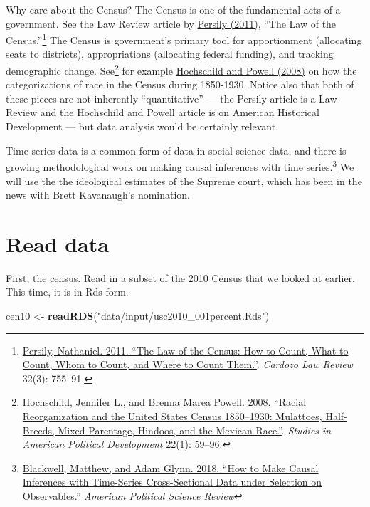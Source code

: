 \documentclass[]{book}
\newenvironment{Shaded}{\begin{snugshade}}{\end{snugshade}}
\newcommand{\KeywordTok}[1]{\textcolor[rgb]{0.13,0.29,0.53}{\textbf{#1}}}
\newcommand{\NormalTok}[1]{#1}
\newcommand{\StringTok}[1]{\textcolor[rgb]{0.31,0.60,0.02}{#1}}
\let\rmarkdownfootnote\footnote%
\def\footnote{\protect\rmarkdownfootnote}
\theoremstyle{definition}
\theoremstyle{definition}
\theoremstyle{definition}
\theoremstyle{remark}
\begin{document}
\begin{Shaded}
\begin{Highlighting}[]
\begin{Shaded}
\begin{Highlighting}[]
Why care about the Census? The Census is one of the fundamental acts of a government. See the Law Review article by \href{http://cardozolawreview.com/Joomla1.5/content/32-3/Persily.32-3.pdf}{Persily (2011)}, ``The Law of the Census.''\footnote{\href{http://cardozolawreview.com/Joomla1.5/content/32-3/Persily.32-3.pdf}{Persily, Nathaniel. 2011. ``The Law of the Census: How to Count, What to Count, Whom to Count, and Where to Count Them.''}. \emph{Cardozo Law Review} 32(3): 755--91.} The Census is government's primary tool for apportionment (allocating seats to districts), appropriations (allocating federal funding), and tracking demographic change. See\footnote{\href{https://dash.harvard.edu/bitstream/handle/1/3153295/hoschschild_racialreorganization.pdf?sequence=2}{Hochschild, Jennifer L., and Brenna Marea Powell. 2008. ``Racial Reorganization and the United States Census 1850--1930: Mulattoes, Half-Breeds, Mixed Parentage, Hindoos, and the Mexican Race.''}. \emph{Studies in American Political Development} 22(1): 59--96.} for example \href{https://dash.harvard.edu/bitstream/handle/1/3153295/hoschschild_racialreorganization.pdf?sequence=2}{Hochschild and Powell (2008)} on how the categorizations of race in the Census during 1850-1930. Notice also that both of these pieces are not inherently ``quantitative'' --- the Persily article is a Law Review and the Hochschild and Powell article is on American Historical Development --- but data analysis would be certainly relevant.

Time series data is a common form of data in social science data, and there is growing methodological work on making causal inferences with time series.\footnote{\href{https://doi.org/10.1017/S0003055418000357}{Blackwell, Matthew, and Adam Glynn. 2018. ``How to Make Causal Inferences with Time-Series Cross-Sectional Data under Selection on Observables.''} \emph{American Political Science Review}} We will use the the ideological estimates of the Supreme court, which has been in the news with Brett Kavanaugh's nomination.

\hypertarget{read-data-2}{%
\section{Read data}\label{read-data-2}}

First, the census. Read in a subset of the 2010 Census that we looked at earlier. This time, it is in Rds form.

\begin{Shaded}
\begin{Highlighting}[]
\NormalTok{cen10 <-}\StringTok{ }\KeywordTok{readRDS}\NormalTok{(}\StringTok{"data/input/usc2010_001percent.Rds"}\NormalTok{)}
\end{Highlighting}
\end{Shaded}


\end{Highlighting}
\end{Shaded}
\end{Highlighting}
\end{Shaded}
\end{document}
